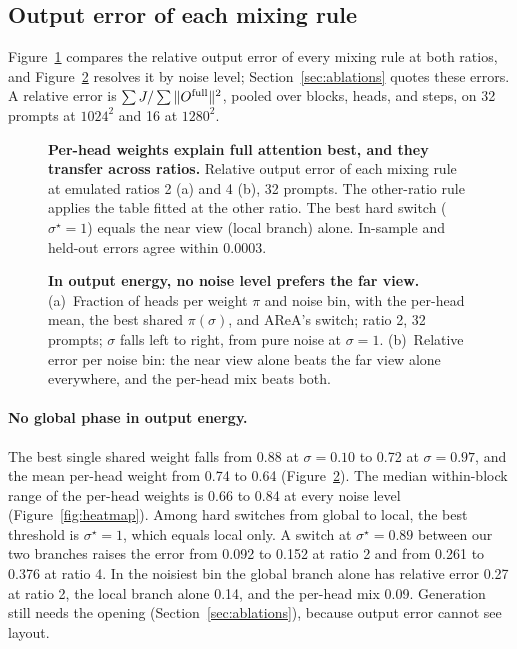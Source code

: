 \subsection{Output error of each mixing rule}
\label{app:emu_error}

Figure~\ref{fig:relerr} compares the relative output error of every mixing rule at both ratios, and Figure~\ref{fig:pisigma} resolves it by noise level; Section~\ref{sec:ablations} quotes these errors. A relative error is $\sum J/\sum\|O^{\mathrm{full}}\|^2$, pooled over blocks, heads, and steps, on 32 prompts at $1024^2$ and 16 at $1280^2$.

\begin{figure}[!htbp]
  \centering
  \caption{\textbf{Per-head weights explain full attention best, and they transfer across ratios.} Relative output error of each mixing rule at emulated ratios 2 (a) and 4 (b), 32 prompts. The other-ratio rule applies the table fitted at the other ratio. The best hard switch ($\sigma^\star = 1$) equals the near view (local branch) alone. In-sample and held-out errors agree within 0.0003.}
  \label{fig:relerr}
\end{figure}

\begin{figure}[!htbp]
  \centering
  \caption{\textbf{In output energy, no noise level prefers the far view.} (a)~Fraction of heads per weight $\pi$ and noise bin, with the per-head mean, the best shared $\pi(\sigma)$, and AReA's switch; ratio 2, 32 prompts; $\sigma$ falls left to right, from pure noise at $\sigma=1$. (b)~Relative error per noise bin: the near view alone beats the far view alone everywhere, and the per-head mix beats both.}
  \label{fig:pisigma}
\end{figure}

\paragraph{No global phase in output energy.} The best single shared weight falls from 0.88 at $\sigma=0.10$ to 0.72 at $\sigma=0.97$, and the mean per-head weight from 0.74 to 0.64 (Figure~\ref{fig:pisigma}). The median within-block range of the per-head weights is 0.66 to 0.84 at every noise level (Figure~\ref{fig:heatmap}). Among hard switches from global to local, the best threshold is $\sigma^\star=1$, which equals local only. A switch at $\sigma^\star=0.89$ between our two branches raises the error from 0.092 to 0.152 at ratio 2 and from 0.261 to 0.376 at ratio 4. In the noisiest bin the global branch alone has relative error 0.27 at ratio 2, the local branch alone 0.14, and the per-head mix 0.09. Generation still needs the opening (Section~\ref{sec:ablations}), because output error cannot see layout.


